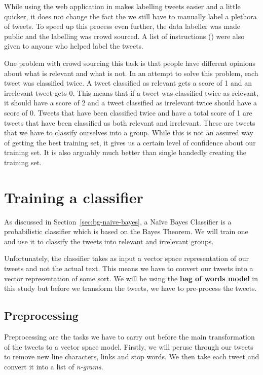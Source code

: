 While using the web application in  makes labelling tweets easier and a
little quicker, it does not change the fact the we still have to manually label a plethora of
tweets. To speed up this process even further, the data labeller was made public and the labelling
was crowd sourced. A list of instructions () were also given
to anyone who helped label the tweets.

One problem with crowd sourcing this task is that people have different opinions about what is
relevant and what is not. In an attempt to solve this problem, each tweet was classified twice. A
tweet classified as relevant gets a score of 1 and an irrelevant tweet gets 0. This means that if a
tweet was classified twice as relevant, it should have a score of 2 and a tweet classified as
irrelevant twice should have a score of 0. Tweets that have been classified twice and have a total
score of 1 are tweets that have been classified as both relevant and irrelevant. These are tweets
that we have to classify ourselves into a group. While this is not an assured way of getting the
best training set, it gives us a certain level of confidence about our training set. It is also
arguably much better than single handedly creating the training set.

\section{Training a classifier}
\label{sec:training-classifier}
As discussed in Section~\ref{sec:bg-naive-bayes}, a Na\"{i}ve Bayes Classifier is a probabilistic
classifier which is based on the Bayes Theorem. We will train one and use it to classify the tweets
into relevant and irrelevant groups.

Unfortunately, the classifier takes as input a vector space representation of our tweets and not the
actual text. This means we have to convert our tweets into a vector representation of some sort. We
will be using the \textbf{bag of words model} in this study but before we transform the tweets, we
have to pre-process the tweets.

\subsection{Preprocessing}
\label{sec:classification-preprocessing}
Preprocessing are the tasks we have to carry out before the main transformation of the tweets to a
vector space model. Firstly, we will peruse through our tweets to remove new line characters, links
and stop words. We then take each tweet and convert it into a list of \textit{n-grams}.

